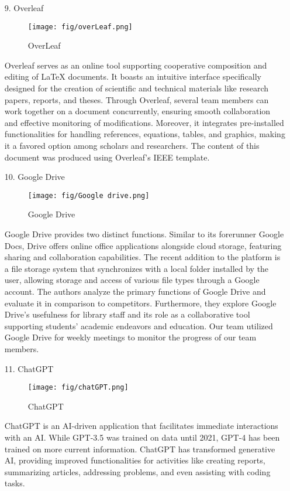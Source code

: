 \documentclass[conference]{IEEEtran}
\begin{document}
\begin{enumerate}
    \item[9.]Overleaf \\
    \begin{figure}[h]
    \centering
    \texttt{[image: fig/overLeaf.png]}
    \label{fig:OverLeaf}
    \caption{OverLeaf} 
    \end{figure}
    \item[]Overleaf serves as an online tool supporting cooperative composition and editing of LaTeX documents. It boasts an intuitive interface specifically designed for the creation of scientific and technical materials like research papers, reports, and theses. Through Overleaf, several team members can work together on a document concurrently, ensuring smooth collaboration and effective monitoring of modifications. Moreover, it integrates pre-installed functionalities for handling references, equations, tables, and graphics, making it a favored option among scholars and researchers. The content of this document was produced using Overleaf's IEEE template. \\ 

    \item[10.]Google Drive \cite{gallaway2013google}
    \begin{figure}[h]
    \centering
    \texttt{[image: fig/Google drive.png]}
    \label{fig:Google Drive}
    \caption{Google Drive} 
    \end{figure}
    \item[]Google Drive provides two distinct functions. Similar to its forerunner Google Docs, Drive offers online office applications alongside cloud storage, featuring sharing and collaboration capabilities. The recent addition to the platform is a file storage system that synchronizes with a local folder installed by the user, allowing storage and access of various file types through a Google account. The authors analyze the primary functions of Google Drive and evaluate it in comparison to competitors. Furthermore, they explore Google Drive's usefulness for library staff and its role as a collaborative tool supporting students' academic endeavors and education. Our team utilized Google Drive for weekly meetings to monitor the progress of our team members.\\ 

    \item[11.]ChatGPT
    \begin{figure}[h]
    \centering
    \texttt{[image: fig/chatGPT.png]}
    \label{fig:ChatGPT}
    \caption{ChatGPT} 
    \end{figure}
    \item[]ChatGPT is an AI-driven application that facilitates immediate interactions with an AI. While GPT-3.5 was trained on data until 2021, GPT-4 has been trained on more current information. ChatGPT has transformed generative AI, providing improved functionalities for activities like creating reports, summarizing articles, addressing problems, and even assisting with coding tasks.
    \clearpage
   

\end{enumerate}
\end{document}

